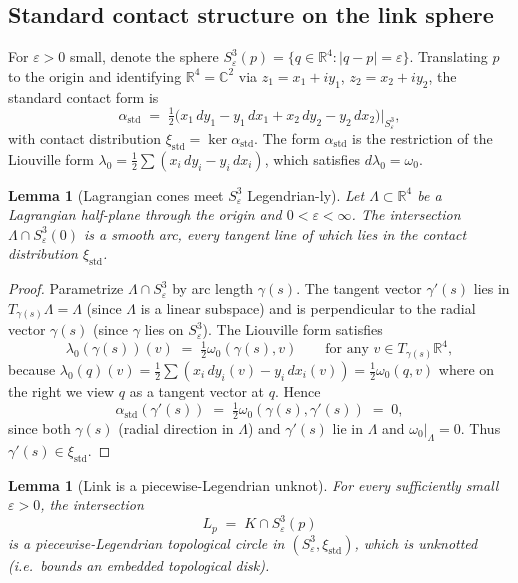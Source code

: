 \documentclass[12pt]{article}
\newtheorem{lemma}[theorem]{Lemma}
\theoremstyle{definition}
\begin{document}
\subsection{Standard contact structure on the link sphere}

For $\varepsilon>0$ small, denote the sphere $S^3_\varepsilon(p)=\{q\in\mathbb{R}^4:|q-p|=\varepsilon\}$. Translating $p$ to the origin and identifying $\mathbb{R}^4=\mathbb{C}^2$ via $z_1=x_1+iy_1$, $z_2=x_2+iy_2$, the standard contact form is
\begin{equation}\label{eq:alpha}
\alpha_{\mathrm{std}} \;=\; \tfrac{1}{2}\bigl(x_1\,dy_1-y_1\,dx_1+x_2\,dy_2-y_2\,dx_2\bigr)\Big|_{S^3_\varepsilon},
\end{equation}
with contact distribution $\xi_{\mathrm{std}}=\ker\alpha_{\mathrm{std}}$. The form $\alpha_{\mathrm{std}}$ is the restriction of the Liouville form $\lambda_0=\tfrac{1}{2}\sum(x_i\,dy_i-y_i\,dx_i)$, which satisfies $d\lambda_0=\omega_0$.

\begin{lemma}[Lagrangian cones meet $S^3_\varepsilon$ Legendrian-ly]\label{lem:legendrian}
Let $\Lambda\subset\mathbb{R}^4$ be a Lagrangian half-plane through the origin and $0<\varepsilon<\infty$. The intersection $\Lambda\cap S^3_\varepsilon(0)$ is a smooth arc, every tangent line of which lies in the contact distribution $\xi_{\mathrm{std}}$.
\end{lemma}

\begin{proof}
Parametrize $\Lambda\cap S^3_\varepsilon$ by arc length $\gamma(s)$. The tangent vector $\gamma'(s)$ lies in $T_{\gamma(s)}\Lambda=\Lambda$ (since $\Lambda$ is a linear subspace) and is perpendicular to the radial vector $\gamma(s)$ (since $\gamma$ lies on $S^3_\varepsilon$). The Liouville form satisfies
\[
\lambda_0(\gamma(s))(v) \;=\; \tfrac{1}{2}\omega_0(\gamma(s),v) \qquad\text{for any } v\in T_{\gamma(s)}\mathbb{R}^4,
\]
because $\lambda_0(q)(v)=\tfrac{1}{2}\sum(x_i\,dy_i(v)-y_i\,dx_i(v))=\tfrac{1}{2}\omega_0(q,v)$ where on the right we view $q$ as a tangent vector at $q$. Hence
\[
\alpha_{\mathrm{std}}(\gamma'(s)) \;=\; \tfrac{1}{2}\omega_0(\gamma(s),\gamma'(s)) \;=\; 0,
\]
since both $\gamma(s)$ (radial direction in $\Lambda$) and $\gamma'(s)$ lie in $\Lambda$ and $\omega_0|_\Lambda=0$. Thus $\gamma'(s)\in\xi_{\mathrm{std}}$.
\end{proof}

\begin{lemma}[Link is a piecewise-Legendrian unknot]\label{lem:link}
For every sufficiently small $\varepsilon>0$, the intersection
\begin{equation}\label{eq:link}
L_p \;=\; K\cap S^3_\varepsilon(p)
\end{equation}
is a piecewise-Legendrian topological circle in $(S^3_\varepsilon,\xi_{\mathrm{std}})$, which is unknotted (i.e.\ bounds an embedded topological disk).
\end{lemma}
\end{document}
